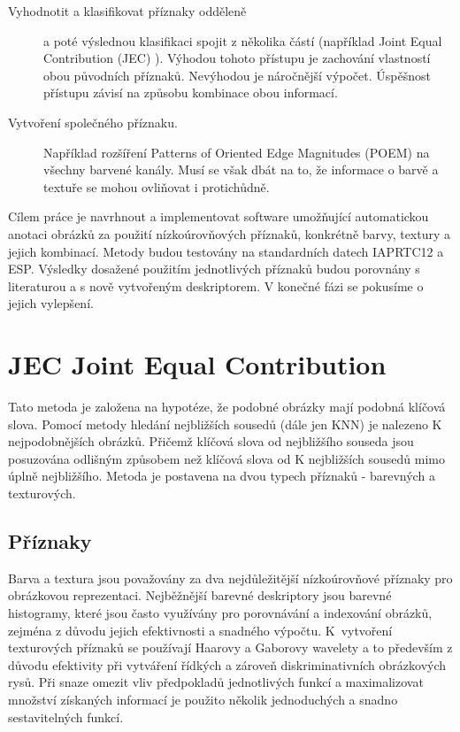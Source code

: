 \documentclass[czech,BP]{thesiskiv}
\begin{document}
\begin{description}
\item[Vyhodnotit a klasifikovat příznaky odděleně] 
a poté výslednou klasifikaci spojit z několika částí (například Joint Equal Contribution (JEC) \cite{JEC} ). Výhodou tohoto přístupu je zachování vlastností obou původních příznaků. Nevýhodou je náročnější výpočet. Úspěšnost přístupu závisí na způsobu kombinace obou informací.

\item[Vytvoření společného příznaku.] 
Například rozšíření Patterns of Oriented Edge Magnitudes (POEM) na všechny barvené kanály. Musí se však dbát na to, že informace o barvě a textuře se mohou ovliňovat i protichůdně. 
\end{description} 

\par Cílem práce je navrhnout a implementovat software umožňující automatickou anotaci obrázků za použití nízkoúrovňových příznaků, konkrétně barvy, textury a jejich kombinací. Metody budou testovány na standardních datech IAPRTC12 a ESP. Výsledky dosažené použitím jednotlivých příznaků budou porovnány s literaturou a s nově vytvořeným deskriptorem. V konečné fázi se pokusíme o jejich vylepšení.

\chapter{JEC Joint Equal Contribution}
Tato metoda je založena na hypotéze, že podobné obrázky mají podobná klíčová slova. Pomocí metody hledání nejbližších sousedů (dále jen KNN) je nalezeno K nejpodobnějších obrázků. Přičemž klíčová slova od nejbližšího souseda jsou posuzována odlišným způsobem než klíčová slova od K nejbližších sousedů mimo úplně nejbližšího. Metoda je postavena na dvou typech příznaků - barevných a texturových. 
\cite{JEC}

\section{Příznaky}
\par Barva a textura jsou považovány za dva nejdůležitější nízkoúrovňové příznaky pro obrázkovou reprezentaci. Nejběžnější barevné deskriptory jsou barevné histogramy, které jsou často využívány pro porovnávání a indexování obrázků, zejména z důvodu jejich efektivnosti a snadného výpočtu. K~vytvoření texturových příznaků se používají Haarovy a Gaborovy wavelety a to především z důvodu efektivity při vytváření řídkých a zároveň diskriminativních obrázkových rysů. Při snaze omezit vliv předpokladů jednotlivých funkcí a maximalizovat množství získaných informací je použito několik jednoduchých a snadno sestavitelných funkcí. \cite{JEC}
\end{document}
